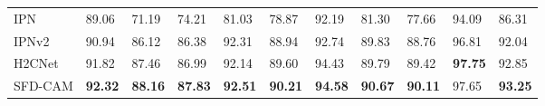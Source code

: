 \documentclass[times, review, 10pt]{elsarticle}
\begin{document}
\begin{CJK}{UTF8}{gbsn}
\begin{table}[htb]
\begin{tabular}{lllllllllll}
IPN           & 89.06          & 71.19          & 74.21          & 81.03          & 78.87          & 92.19          & 81.30          & 77.66          & 94.09          & 86.31\textbf{} \\
IPNv2         & 90.94          & 86.12          & 86.38          & 92.31          & 88.94          & 92.74          & 89.83          & 88.76          & 96.81          & 92.04\textbf{} \\
H2CNet        & 91.82          & 87.46          & 86.99          & 92.14          & 89.60          & 94.43          & 89.79          & 89.42          & \textbf{97.75} & 92.85\textbf{} \\
SFD-CAM       & \textbf{92.32} & \textbf{88.16} & \textbf{87.83} & \textbf{92.51} & \textbf{90.21} & \textbf{94.58} & \textbf{90.67} & \textbf{90.11} & 97.65          & \textbf{93.25} \\
\bottomrule
\end{tabular}
\end{table}







\end{CJK}
\end{document}
